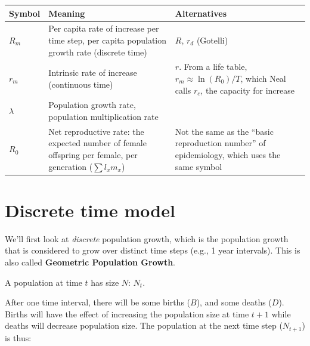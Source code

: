 \documentclass[
  a4paper]{book}
\newcounter{none} %
\begin{document}
{\def\LTcaptype{none} %
\begin{longtable}[]{@{}
  >{\raggedright\arraybackslash}p{}
  >{\raggedright\arraybackslash}p{}
  >{\raggedright\arraybackslash}p{}@{}}
\toprule\noalign{}
\begin{minipage}[b]{\linewidth}\raggedright
Symbol
\end{minipage} & \begin{minipage}[b]{\linewidth}\raggedright
Meaning
\end{minipage} & \begin{minipage}[b]{\linewidth}\raggedright
Alternatives
\end{minipage} \\
\midrule\noalign{}
\endhead
\bottomrule\noalign{}
\endlastfoot
\(R_m\) & Per capita rate of increase per time step, per capita population growth rate (discrete time) & \(R\), \(r_d\) (Gotelli) \\
\(r_m\) & Intrinsic rate of increase (continuous time) & \(r\). From a life table, \(r_m \approx \ln(R_0)/T\), which Neal calls \(r_c\), the capacity for increase \\
\(\lambda\) & Population growth rate, population multiplication rate & \\
\(R_0\) & Net reproductive rate: the expected number of female offspring per female, per generation (\(\sum l_x m_x\)) & Not the same as the ``basic reproduction number'' of epidemiology, which uses the same symbol \\
\end{longtable}
}

\section{Discrete time model}\label{discrete-time-model}

We'll first look at \emph{discrete} population growth, which is the population growth that is considered to grow over distinct time steps (e.g., 1 year intervals). This is also called \textbf{Geometric Population Growth}.

A population at time \(t\) has size \(N\): \(N_t\).

After one time interval, there will be some births (\(B\)), and some deaths (\(D\)). Births will have the effect of increasing the population size at time \(t+1\) while deaths will decrease population size. The population at the next time step (\(N_{t+1}\)) is thus:
\end{document}
